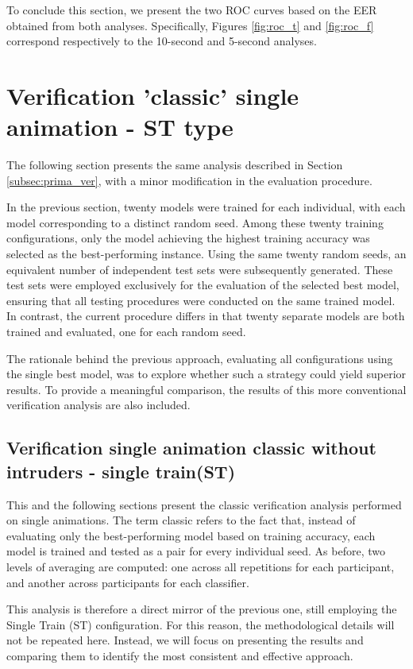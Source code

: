 \documentclass[12pt]{report}
\begin{document}
To conclude this section, we present the two ROC curves based on the EER obtained from both analyses.
Specifically, Figures \ref{fig:roc_t} and \ref{fig:roc_f} correspond respectively to the 10-second and 5-second analyses.
\FloatBarrier

\section{Verification 'classic' single animation - ST type}

The following section presents the same analysis described in Section \ref{subsec:prima_ver}, with a minor modification in the evaluation procedure.

In the previous section, twenty models were trained for each individual, with each model corresponding to a distinct random seed.
Among these twenty training configurations, only the model achieving the highest training accuracy was selected as the best-performing instance.
Using the same twenty random seeds, an equivalent number of independent test sets were subsequently generated.
These test sets were employed exclusively for the evaluation of the selected best model, ensuring that all testing procedures were conducted on the same trained model.
In contrast, the current procedure differs in that twenty separate models are both trained and evaluated, one for each random seed.

The rationale behind the previous approach, evaluating all configurations using the single best model, was to explore whether such a strategy could yield superior results.
To provide a meaningful comparison, the results of this more conventional verification analysis are also included.

\subsection{Verification single animation classic without intruders - single train(ST)}
\label{subsec:s_vs_cst}

This and the following sections present the classic verification analysis performed on single animations.
The term classic refers to the fact that, instead of evaluating only the best-performing model based on training accuracy, each model is trained and tested as a pair for every individual seed.
As before, two levels of averaging are computed: one across all repetitions for each participant, and another across participants for each classifier.

This analysis is therefore a direct mirror of the previous one, still employing the Single Train (ST) configuration.
For this reason, the methodological details will not be repeated here.
Instead, we will focus on presenting the results and comparing them to identify the most consistent and effective approach.
\end{document}
